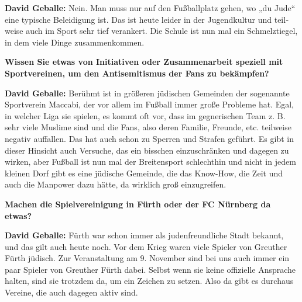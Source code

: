 \begin{otherlanguage}{ngerman}
\textbf{David Geballe:} Nein. Man muss nur auf den Fußballplatz gehen, wo „du Jude“ eine typische Beleidigung ist. Das ist heute leider in der Jugendkultur und teilweise auch im Sport sehr tief verankert. Die Schule ist nun mal ein Schmelztiegel, in dem viele Dinge zusammenkommen. 

\textbf{Wissen Sie etwas von Initiativen oder Zusammenarbeit speziell mit Sportvereinen, um den Antisemitismus der Fans zu bekämpfen?} 

\textbf{David Geballe:} Berühmt ist in größeren jüdischen Gemeinden der sogenannte Sportverein Maccabi, der vor allem im Fußball immer große Probleme hat. Egal, in welcher Liga sie spielen, es kommt oft vor, dass im gegnerischen Team z. B. sehr viele Muslime sind und die Fans, also deren Familie, Freunde, etc. teilweise negativ auffallen. Das hat auch schon zu Sperren und Strafen geführt. Es gibt in dieser Hinsicht auch Versuche, das ein bisschen einzuschränken und dagegen zu wirken, aber Fußball ist nun mal der Breitensport schlechthin und nicht in jedem kleinen Dorf gibt es eine jüdische Gemeinde, die das Know-How, die Zeit und auch die Manpower dazu hätte, da wirklich groß einzugreifen. 

\textbf{Machen die Spielvereinigung in Fürth oder der FC Nürnberg da etwas?} 

\textbf{David Geballe:} Fürth war schon immer als judenfreundliche Stadt bekannt, und das gilt auch heute noch. Vor dem Krieg waren viele Spieler von Greuther Fürth jüdisch. Zur Veranstaltung am 9. November sind bei uns auch immer ein paar Spieler von Greuther Fürth dabei. Selbst wenn sie keine offizielle Ansprache halten, sind sie trotzdem da, um ein Zeichen zu setzen. Also da gibt es durchaus Vereine, die auch dagegen aktiv sind. 
\end{otherlanguage}